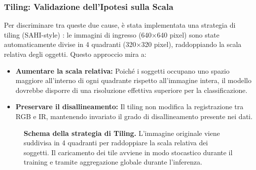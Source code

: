 \documentclass[a4paper,12pt]{article}
\begin{document}
\subsubsection{Tiling: Validazione dell'Ipotesi sulla Scala}

Per discriminare tra queste due cause, è stata implementata una strategia di tiling (SAHI-style) \cite{sahi_paper}: le immagini di ingresso (640×640 pixel) sono state automaticamente divise in 4 quadranti (320×320 pixel), raddoppiando la scala relativa degli oggetti. Questo approccio mira a:
\begin{itemize}
    \item \textbf{Aumentare la scala relativa:} Poiché i soggetti occupano uno spazio maggiore all'interno di ogni quadrante rispetto all'immagine intera, il modello dovrebbe disporre di una risoluzione effettiva superiore per la classificazione.
    \item \textbf{Preservare il disallineamento:} Il tiling non modifica la registrazione tra RGB e IR, mantenendo invariato il grado di disallineamento presente nei dati.
\end{itemize}

\begin{figure}[H]
\centering
{}
\caption{\textbf{Schema della strategia di Tiling.} L'immagine originale viene suddivisa in 4 quadranti per raddoppiare la scala relativa dei soggetti. Il caricamento dei tile avviene in modo stocastico durante il training e tramite aggregazione globale durante l'inferenza.}
\end{figure}
\end{document}
